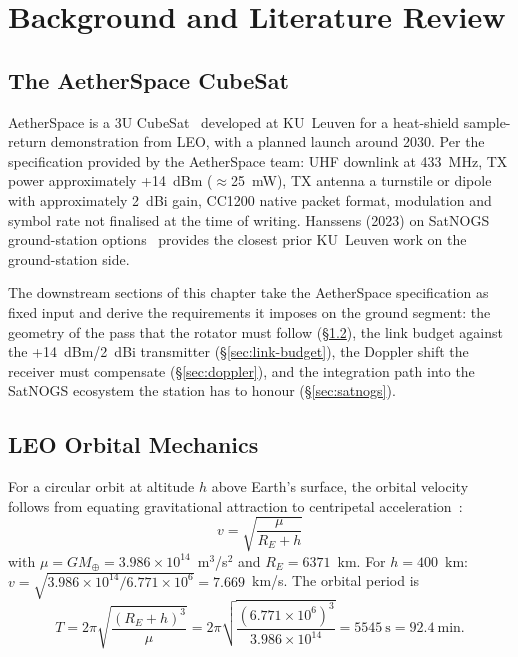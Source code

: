 \chapter{Background and Literature Review}
\label{ch:background}

\section{The AetherSpace CubeSat}
\label{sec:aetherspace}

AetherSpace is a 3U CubeSat~\cite{cubesat-spec} developed at KU~Leuven for a heat-shield sample-return demonstration from LEO, with a planned launch around 2030. Per the specification provided by the AetherSpace team: UHF downlink at 433~MHz, TX power approximately +14~dBm ($\approx$25~mW), TX antenna a turnstile or dipole with approximately 2~dBi gain, CC1200 native packet format, modulation and symbol rate not finalised at the time of writing. Hanssens (2023) on SatNOGS ground-station options~\cite{hanssens2023} provides the closest prior KU~Leuven work on the ground-station side.

The downstream sections of this chapter take the AetherSpace specification as fixed input and derive the requirements it imposes on the ground segment: the geometry of the pass that the rotator must follow (\S\ref{sec:orbital-mechanics}), the link budget against the +14~dBm/2~dBi transmitter (\S\ref{sec:link-budget}), the Doppler shift the receiver must compensate (\S\ref{sec:doppler}), and the integration path into the SatNOGS ecosystem the station has to honour (\S\ref{sec:satnogs}).

\section{LEO Orbital Mechanics}
\label{sec:orbital-mechanics}

For a circular orbit at altitude $h$ above Earth's surface, the orbital velocity follows from equating gravitational attraction to centripetal acceleration~\cite{montenbruck2000orbits}:
\begin{equation}
    v = \sqrt{\frac{\mu}{R_E + h}}
\end{equation}
with $\mu = GM_\oplus = 3.986 \times 10^{14}$~m$^3$/s$^2$ and $R_E = 6371$~km. For $h = 400$~km: $v = \sqrt{3.986 \times 10^{14} / 6.771 \times 10^6} = 7.669$~km/s. The orbital period is
\begin{equation}
    T = 2\pi \sqrt{\frac{(R_E + h)^3}{\mu}} = 2\pi \sqrt{\frac{(6.771 \times 10^6)^3}{3.986 \times 10^{14}}} = 5545~\text{s} = 92.4~\text{min}.
\end{equation}

